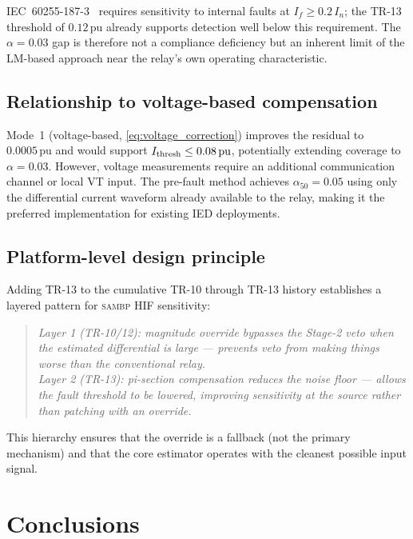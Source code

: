 \documentclass[11pt,a4paper]{article}
\newcommand{\sambp}{\textsc{sambp}}
\newcommand{\alphafifty}{\alpha_{50}}
\newcommand{\pu}{\,\text{pu}}
\begin{document}
IEC~60255-187-3~\cite{IEC60255} requires sensitivity to internal faults at
$I_f \geq 0.2\,I_n$; the TR-13 threshold of $0.12\pu$ already supports
detection well below this requirement.  The $\alpha = 0.03$ gap is therefore
not a compliance deficiency but an inherent limit of the LM-based approach
near the relay's own operating characteristic.

\subsection{Relationship to voltage-based compensation}

Mode~1 (voltage-based, \eqref{eq:voltage_correction}) improves the residual
to $0.0005\pu$ and would support $I_{\rm thresh} \leq 0.08\pu$, potentially
extending coverage to $\alpha = 0.03$.  However, voltage measurements require
an additional communication channel or local VT input.  The pre-fault method
achieves $\alphafifty = 0.05$ using only the differential current waveform
already available to the relay, making it the preferred implementation for
existing IED deployments.

\subsection{Platform-level design principle}

Adding TR-13 to the cumulative TR-10 through TR-13 history establishes a
layered pattern for \sambp{} HIF sensitivity:

\begin{quotation}
  \noindent\emph{Layer 1 (TR-10/12): magnitude override bypasses the Stage-2
  veto when the estimated differential is large --- prevents veto from making
  things worse than the conventional relay.}\\
  \emph{Layer 2 (TR-13): pi-section compensation reduces the noise floor ---
  allows the fault threshold to be lowered, improving sensitivity at the
  source rather than patching with an override.}
\end{quotation}

This hierarchy ensures that the override is a fallback (not the primary
mechanism) and that the core estimator operates with the cleanest possible
input signal.

\section{Conclusions}
\label{sec:conclusions}
\end{document}
